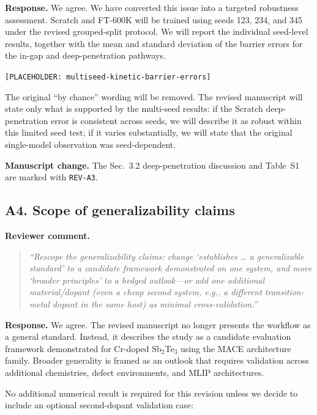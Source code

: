 \documentclass[11pt,a4paper]{article}
\begin{document}
\noindent\textbf{Response.}
We agree. We have converted this issue into a targeted robustness assessment. Scratch and FT-600K will be trained using seeds 123, 234, and 345 under the revised grouped-split protocol. We will report the individual seed-level results, together with the mean and standard deviation of the barrier errors for the in-gap and deep-penetration pathways.

\begin{center}
\texttt{[PLACEHOLDER: multiseed-kinetic-barrier-errors]}
\end{center}

The original ``by chance'' wording will be removed. The revised manuscript will state only what is supported by the multi-seed results: if the Scratch deep-penetration error is consistent across seeds, we will describe it as robust within this limited seed test; if it varies substantially, we will state that the original single-model observation was seed-dependent.

\noindent\textbf{Manuscript change.}
The Sec.~3.2 deep-penetration discussion and Table~S1 are marked with \texttt{REV-A3}.

\subsection*{A4. Scope of generalizability claims}

\noindent\textbf{Reviewer comment.}
\begin{quote}
\itshape
``Rescope the generalizability claims: change `establishes \ldots{} a generalizable standard' to a candidate framework demonstrated on one system, and move `broader principles' to a hedged outlook---or add one additional material/dopant (even a cheap second system, e.g., a different transition-metal dopant in the same host) as minimal cross-validation.''
\end{quote}

\noindent\textbf{Response.}
We agree. The revised manuscript no longer presents the workflow as a general standard. Instead, it describes the study as a candidate evaluation framework demonstrated for Cr-doped Sb$_2$Te$_3$ using the MACE architecture family. Broader generality is framed as an outlook that requires validation across additional chemistries, defect environments, and MLIP architectures.

No additional numerical result is required for this revision unless we decide to include an optional second-dopant validation case:
\end{document}
